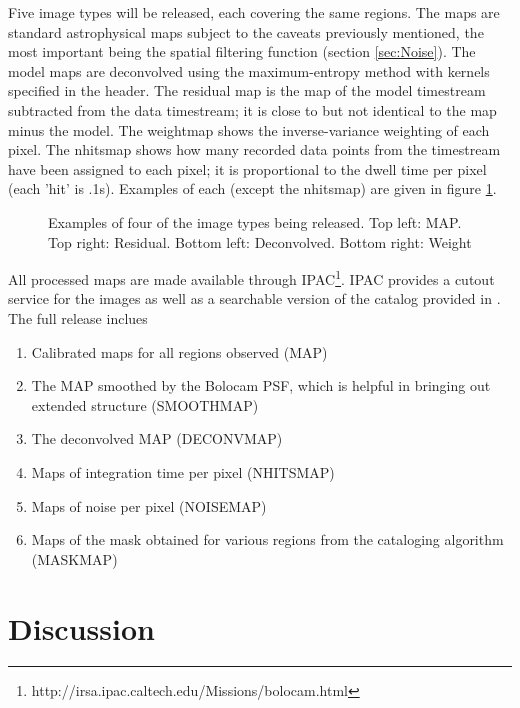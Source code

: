 \documentclass[12pt,preprint]{aastex}
\def\Figure#1#2#3#4{
\begin{figure}[htb]
\epsscale{#4}
\plotone{#1}
\caption{#2}
\label{#3}
\end{figure}
}
\begin{document}
Five image types will be released, each covering the same regions.  The maps
are standard astrophysical maps subject to the caveats previously mentioned,
the most important being the spatial filtering function (section \ref{sec:Noise}).
The model maps are deconvolved using the maximum-entropy method with kernels
specified in the header.  The residual map is the map of the model timestream
subtracted from the data timestream; it is close to but not identical to the
map minus the model.  The weightmap shows the inverse-variance weighting of
each pixel.  The nhitsmap shows how many recorded data points from the
timestream have been assigned to each pixel; it is proportional to the dwell
time per pixel (each 'hit' is .1s).  Examples of each (except the nhitsmap)
are given in figure \ref{fig:sampleimages}.

\Figure{image_types}{Examples of four of the image types being released.  Top
left: MAP.  Top right: Residual.  Bottom left: Deconvolved.  Bottom right:
Weight}{fig:sampleimages}{1.0}


All processed maps are made available through
IPAC\footnote{http://irsa.ipac.caltech.edu/Missions/bolocam.html}.
IPAC provides a cutout service for the images as well as a searchable
version of the catalog provided in \citep{rosolowsky09}.  The full
release inclues
\begin{enumerate}
\item Calibrated maps for all regions observed (MAP)
\item The MAP smoothed by the Bolocam PSF, which is helpful in bringing out extended structure (SMOOTHMAP)
\item The deconvolved MAP (DECONVMAP)
\item Maps of integration time per pixel (NHITSMAP)
\item Maps of noise per pixel (NOISEMAP)
\item Maps of the mask obtained for various regions from the cataloging algorithm (MASKMAP)
\end{enumerate}


\section{Discussion}
\label{sec:Discussion}
\end{document}
